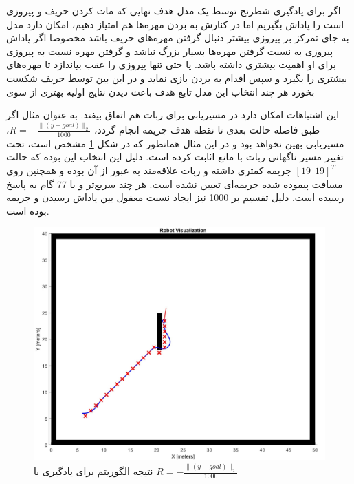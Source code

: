 اگر برای یادگیری شطرنج توسط یک مدل هدف نهایی که مات کردن حریف و پیروزی است را پاداش بگیریم اما در کنارش به بردن مهره‌ها هم امتیاز دهیم، امکان دارد مدل به جای تمرکز بر پیروزی بیشتر دنبال گرفتن مهره‌های حریف باشد مخصوصا اگر پاداش پیروزی به نسبت گرفتن مهره‌ها بسیار بزرگ نباشد و گرفتن مهره نسبت به پیروزی برای او اهمیت بیشتری داشته باشد. یا حتی تنها پیروزی را عقب بیاندازد تا مهره‌های بیشتری را بگیرد و سپس اقدام به بردن بازی نماید و در این بین توسط حریف شکست بخورد هر چند انتخاب این مدل تابع هدف باعث دیدن نتایج اولیه بهتری از سوی 

این اشتباهات امکان دارد در مسیریابی برای ربات هم اتفاق بیفتد. به عنوان مثال اگر طبق فاصله حالت بعدی تا نقطه هدف جریمه انجام گردد، $R=-\frac{\|(y-goal)\|_2}{1000}$، مسیریابی بهین نخواهد بود و در این مثال همانطور که در شکل \ref{Fig QL R=-normpos-goal} مشخص است، تحت تغییر مسیر ناگهانی ربات با مانع اثابت کرده است. دلیل این انتخاب این بوده که حالت $[19~~19]^T$ جریمه کمتری داشته و ربات علاقه‌مند به عبور از آن بوده و همچنین روی مسافت پیموده شده جریمه‌ای تعیین نشده است. هر چند سریع‌تر و با 77 گام به پاسخ رسیده است. دلیل تقسیم بر 1000 نیز ایجاد نسبت معقول بین پاداش رسیدن و جریمه بوده است.
\begin{figure}[!h]
	\centering
	\includegraphics[scale=0.3]{Images/QL path R=-normpos-goal.jpg}
	\caption{نتیجه الگوریتم  برای یادگیری با $R=-\frac{\|(y-goal)\|_2}{1000}$}\label{Fig QL R=-normpos-goal}
\end{figure}

